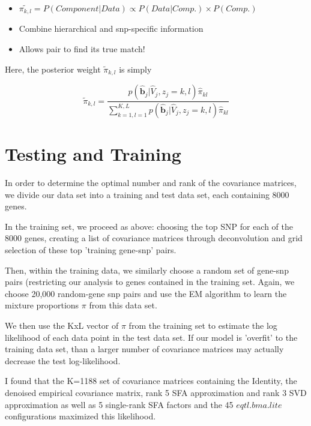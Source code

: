 \documentclass[10pt,letterpaper]{article}
\begin{document}
\begin{itemize}
\item $\tilde{\pi_{k,l}} = P(Component|Data) \propto  P(Data|Comp.) \times P(Comp.)$ 
\item Combine hierarchical and snp-specific information
\item  Allows pair to find its true match!
\end{itemize}

Here, the posterior weight $\tilde \pi_{k,l}$ is simply 

 
 \begin{equation}
 \label{post.pi}
\tilde \pi_{k,l} =\frac{ p(\hat{\bm{b}}_{j}| \hat{V}_{j}, z_{j}=k,l) \hat \pi_{kl}} {\sum_{k=1,l=1}^{K,L} p(\hat{\bm{b}}_{j}| \hat{V}_{j}, z_{j}=k,l) \hat\pi_{kl}}
\end{equation}




\section{Testing and Training}

In order to determine the optimal number and rank of the covariance matrices, we divide our data set into a training and test data set, each containing 8000 genes.

In the training set, we proceed as above: choosing the top SNP for each of the 8000 genes, creating a list of covariance matrices through deconvolution and grid selection of these top 'training gene-snp' pairs. 

Then, within the training data, we similarly choose a random set of gene-snp pairs (restricting our analysis to genes contained in the training set. Again, we choose 20,000 random-gene snp pairs and use the EM algorithm to learn the mixture proportions $\pi$  from this data set.

We then use the KxL vector of $\pi$ from the training set to estimate the log likelihood of each data point in the test data set. If our model is 'overfit' to the training data set, than a larger number of covariance matrices may actually decrease the test log-likelihood. 

I found that the K=1188 set of covariance matrices containing the Identity, the denoised empirical covariance matrix, rank 5 SFA approximation and rank 3 SVD approximation as well as 5 single-rank SFA factors and the 45 $eqtl.bma.lite$ configurations maximized this likelihood.
\end{document}
